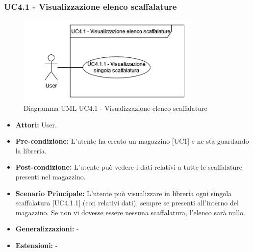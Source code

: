 \subsubsection{UC4.1 - Visualizzazione elenco scaffalature}
\begin{figure}[H]
  \centering
  \includegraphics[width=0.8\textwidth]{UC_diagrams_1-10/UC4.1.drawio.png}
   \caption{Diagramma UML UC4.1 - Visualizzazione elenco scaffalature}
\end{figure}
\begin{itemize}
    \item \textbf{Attori:} User.
    \item \textbf{Pre-condizione:}  L'utente ha creato un magazzino [UC1] e ne sta guardando la libreria.
    \item \textbf{Post-condizione:} L'utente può vedere i dati relativi a tutte le scaffalature presenti nel magazzino.
    \item \textbf{Scenario Principale:} L'utente può visualizzare in libreria ogni singola scaffalatura [UC4.1.1] (con relativi dati), sempre se presenti all'interno del magazzino. Se non vi dovesse essere nessuna scaffalatura, l'elenco sarà nullo.
    \item \textbf{Generalizzazioni:} -
    \item \textbf{Estensioni:} -
\end{itemize}


